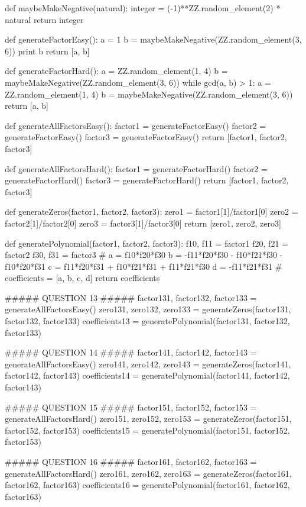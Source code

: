 \documentclass{ximera}
\begin{document}
\begin{sagesilent}
def maybeMakeNegative(natural):
    integer = (-1)**ZZ.random_element(2) * natural
    return integer 

def generateFactorEasy():
    a = 1
    b = maybeMakeNegative(ZZ.random_element(3, 6))
    print b
    return [a, b]

def generateFactorHard():
    a = ZZ.random_element(1, 4)
    b = maybeMakeNegative(ZZ.random_element(3, 6))
    while gcd(a, b) > 1:
        a = ZZ.random_element(1, 4)
        b = maybeMakeNegative(ZZ.random_element(3, 6))
    return [a, b]

def generateAllFactorsEasy():
    factor1 = generateFactorEasy()
    factor2 = generateFactorEasy()
    factor3 = generateFactorEasy()
    return [factor1, factor2, factor3]

def generateAllFactorsHard():
    factor1 = generateFactorHard()
    factor2 = generateFactorHard()
    factor3 = generateFactorHard()
    return [factor1, factor2, factor3]

def generateZeros(factor1, factor2, factor3):
    zero1 = factor1[1]/factor1[0]
    zero2 = factor2[1]/factor2[0]
    zero3 = factor3[1]/factor3[0]
    return [zero1, zero2, zero3]

def generatePolynomial(factor1, factor2, factor3):
    f10, f11 = factor1
    f20, f21 = factor2
    f30, f31 = factor3
    #
    a = f10*f20*f30
    b = -f11*f20*f30 - f10*f21*f30 - f10*f20*f31
    c = f11*f20*f31 + f10*f21*f31 + f11*f21*f30
    d = -f11*f21*f31
    #
    coefficients = [a, b, c, d]
    return coefficients

##### QUESTION 13 #####
factor131, factor132, factor133 = generateAllFactorsEasy()
zero131, zero132, zero133 = generateZeros(factor131, factor132, factor133)
coefficients13 = generatePolynomial(factor131, factor132, factor133)

##### QUESTION 14 #####
factor141, factor142, factor143 = generateAllFactorsEasy()
zero141, zero142, zero143 = generateZeros(factor141, factor142, factor143)
coefficients14 = generatePolynomial(factor141, factor142, factor143)

##### QUESTION 15 #####
factor151, factor152, factor153 = generateAllFactorsHard()
zero151, zero152, zero153 = generateZeros(factor151, factor152, factor153)
coefficients15 = generatePolynomial(factor151, factor152, factor153)

##### QUESTION 16 #####
factor161, factor162, factor163 = generateAllFactorsHard()
zero161, zero162, zero163 = generateZeros(factor161, factor162, factor163)
coefficients16 = generatePolynomial(factor161, factor162, factor163)
\end{sagesilent}
\end{document}
